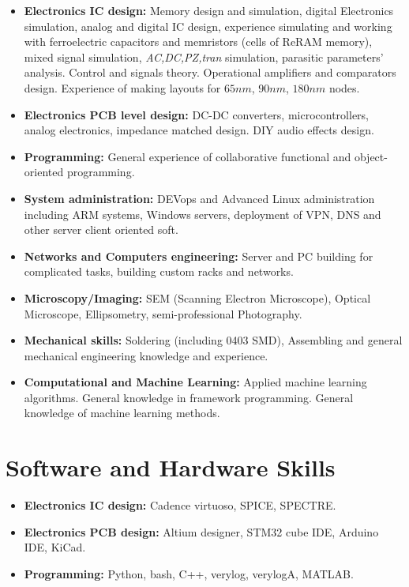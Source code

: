 \documentclass{article}
\begin{document}
\begin{itemize}
\item \textbf{Electronics IC design:} Memory design and simulation, digital Electronics simulation, analog and digital IC design, experience simulating and working with ferroelectric capacitors and memristors (cells of ReRAM memory),   mixed signal simulation, \textit{AC,DC,PZ,tran} simulation, parasitic parameters' analysis. Control and signals theory. Operational amplifiers and comparators design. Experience of making layouts for $65 nm$, $90nm$, $180nm$ nodes. 
\item \textbf{Electronics PCB level design:} DC-DC converters, microcontrollers, analog electronics, impedance matched design. DIY audio effects design. 
\item \textbf{Programming:} General experience of collaborative functional and object-oriented programming.
\item \textbf{System administration:} DEVops and Advanced Linux administration including ARM systems, Windows servers, deployment of VPN, DNS and other server client oriented soft.
\item \textbf{Networks and Computers engineering:} Server and PC building for complicated tasks, building custom racks and networks.
\item \textbf{Microscopy/Imaging:} SEM (Scanning Electron Microscope), Optical Microscope, Ellipsometry, semi-professional Photography.
\item \textbf{Mechanical skills:} Soldering (including 0403 SMD), Assembling and general mechanical engineering knowledge and experience.
\item \textbf{Computational and Machine Learning:} Applied machine learning algorithms. General knowledge in framework programming. General knowledge of machine learning methods.
\end{itemize}
 
\section{Software and Hardware Skills}
\begin{itemize}
\item \textbf{Electronics IC design:} Cadence virtuoso, SPICE, SPECTRE.
\item \textbf{Electronics PCB design:} Altium designer, STM32 cube IDE, Arduino IDE, KiCad.
\item \textbf{Programming:} Python, bash, C++, verylog, verylogA, MATLAB.
\end{itemize}
 
\end{document}
